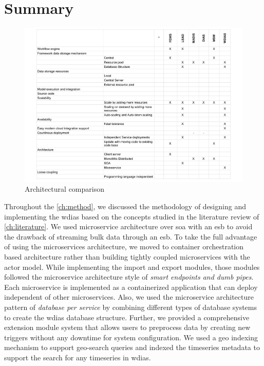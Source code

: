 \section{Summary}
\label{se:method_summary}

\begin{figure}[htp]
    \centering
    \includegraphics[width=1\textwidth]{method/misc/architecture_comparison_pros_cons.pdf}
    \caption{Architectural comparison}
    \label{fi:architecture_comparison_pros_cons}
\end{figure}

Throughout the \cref{ch:method}, we discussed the methodology of designing and implementing the \acrshort{wdias} based on the concepts studied in the literature review of \cref{ch:literature}. We used microservice architecture over \acrshort{soa} with an \acrshort{esb} to avoid the drawback of streaming bulk data through an \acrshort{esb}. To take the full advantage of using the microservices architecture, we moved to container orchestration based architecture rather than building tightly coupled microservices with the actor model. 
While implementing the import and export modules, those modules followed the microservice architecture style of \emph{smart endpoints and dumb pipes}. Each microservice is implemented as a containerized application that can deploy independent of other microservices. Also, we used the microservice architecture pattern of \emph{database per service} by combining different types of database systems to create the \acrshort{wdias} database structure. Further, we provided a comprehensive extension module system that allows users to preprocess data by creating new triggers without any downtime for system configuration. We used a geo indexing mechanism to support geo-search queries and indexed the timeseries metadata to support the search for any timeseries in \acrshort{wdias}.
